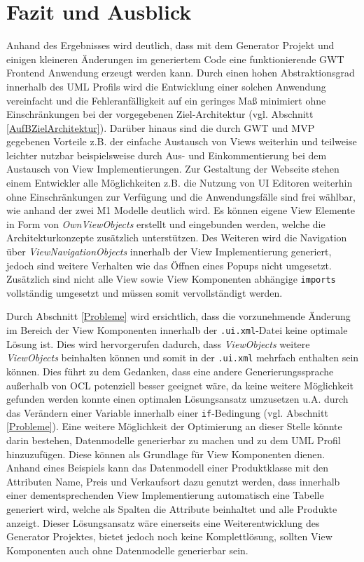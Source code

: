 \chapter{Fazit und Ausblick}
\label{FazitAusblick}
Anhand des Ergebnisses wird deutlich, dass mit dem Generator Projekt und einigen
kleineren Änderungen im generiertem Code eine funktionierende GWT Frontend
Anwendung erzeugt werden kann. Durch einen
hohen Abstraktionsgrad innerhalb des UML Profils wird die Entwicklung einer
solchen Anwendung vereinfacht und die Fehleranfälligkeit auf ein geringes Maß minimiert ohne
Einschränkungen bei der vorgegebenen Ziel-Architektur (vgl. Abschnitt
\ref{AufBZielArchitektur}).
Darüber hinaus sind die durch GWT und MVP gegebenen Vorteile z.B. der
einfache Austausch von Views weiterhin und teilweise leichter nutzbar
beispielsweise durch Aus- und Einkommentierung bei dem Austausch von View
Implementierungen.
Zur Gestaltung der Webseite stehen einem Entwickler alle Möglichkeiten z.B. die
Nutzung von UI Editoren weiterhin ohne Einschränkungen zur Verfügung und die
Anwendungsfälle sind frei wählbar, wie anhand der zwei M1 Modelle deutlich wird.
Es können eigene View Elemente in Form von \textit{OwnViewObjects} erstellt und
eingebunden werden, welche die Architekturkonzepte zusätzlich unterstützen. Des
Weiteren wird die Navigation über \textit{ViewNavigationObjects} innerhalb der View Implementierung
generiert, jedoch sind weitere Verhalten wie das Öffnen eines Popups nicht
umgesetzt. Zusätzlich sind nicht alle View sowie View Komponenten abhängige
\texttt{imports} vollständig umgesetzt und müssen somit vervollständigt werden.

Durch Abschnitt \ref{Probleme} wird ersichtlich, dass die
vorzunehmende Änderung im Bereich der View Komponenten innerhalb der \texttt{.ui.xml}-Datei keine optimale
Lösung ist. Dies wird hervorgerufen dadurch, dass \textit{ViewObjects} weitere
\textit{ViewObjects} beinhalten können und somit in der \texttt{.ui.xml}
mehrfach enthalten sein können. Dies führt zu dem Gedanken, dass eine andere
Generierungssprache außerhalb von OCL potenziell besser geeignet wäre, da keine
weitere Möglichkeit gefunden werden konnte einen optimalen Lösungsansatz
umzusetzen u.A. durch das Verändern einer Variable innerhalb einer
\texttt{if}-Bedingung (vgl. Abschnitt \ref{Probleme}).
Eine weitere Möglichkeit der Optimierung an dieser Stelle könnte darin bestehen,
Datenmodelle generierbar zu machen und zu dem UML Profil hinzuzufügen. Diese
können als Grundlage für View Komponenten dienen.
Anhand eines Beispiels kann das Datenmodell einer Produktklasse mit den Attributen Name,
Preis und Verkaufsort dazu genutzt werden, dass innerhalb einer
dementsprechenden View Implementierung automatisch eine Tabelle generiert wird,
welche als Spalten die Attribute beinhaltet und alle Produkte anzeigt. Dieser Lösungsansatz wäre einerseits eine
Weiterentwicklung des Generator Projektes, bietet jedoch noch keine
Komplettlösung, sollten View Komponenten auch ohne Datenmodelle
generierbar sein.

